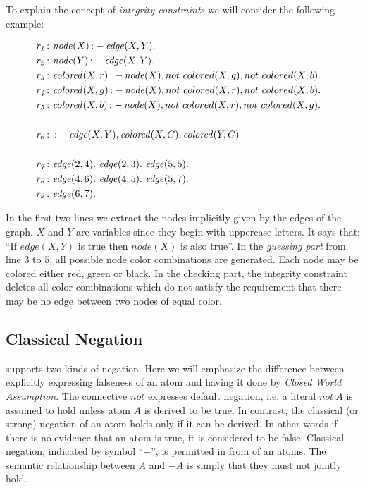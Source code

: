 \documentclass[a4paper, titlepage]{article}
\DeclareMathOperator{\leftimpl}{:-}
\newcommand{\row}[1]{%
  \ensuremath{\it \color{black} #1 \color{black}}%
}
\begin{document}
To explain the concept of \emph{integrity 
constraints} we will consider the following example:
\begin{exmp}
\label{nodecoloring}
\begin{align*}
\row{r_1}\colon & \mathit{node}(X) \leftimpl \mathit{edge}(X, Y). 
&\\
\row{r_2}\colon & \mathit{node}(Y) \leftimpl \mathit{edge}(X, Y). 
& \\
\row{r_3}\colon & \mathit{colored}(X, r) \leftimpl \mathit{node}(X), not \  colored(X,g),not \ colored(X,b). & \\
\row{r_4}\colon & \mathit{colored}(X, g) \leftimpl \mathit{node}(X), not \  colored(X,r),not \ colored(X,b). & \\
\row{r_5}\colon & \mathit{colored}(X, b) \leftimpl \mathit{node}(X), not \  colored(X,r),not \ colored(X,g). & \\
\\
\row{r_6}\colon & \leftimpl \mathit{edge}(X, Y), \mathit{colored}
(X, C), \mathit{colored}(Y, C) & \\
\\
\row{r_7}\colon & \mathit{edge}(2, 4). \  \mathit{edge}(2, 3). \  
\mathit{edge}(5, 5). & \\
\row{r_8}\colon & \mathit{edge}(4, 6). \  \mathit{edge}(4, 5). \ 
\mathit{edge}(5, 7). & \\
\row{r_9}\colon & \mathit{edge}(6, 7). &
\end{align*} 
\end{exmp}
In the first two lines we extract the nodes implicitly given by the edges of the graph.
$X$ and $Y$ are 
variables since they begin with uppercase letters. It says 
that: \enquote{If $\mathit{edge}(X,Y)$ is true then 
$\mathit{node(X)}$ is also true}. In the 
\emph{guessing part} from line $3$ to $5$, all possible node color combinations 
are generated. Each node may be colored either red, 
green or black. In the checking part, the integrity constraint 
deletes all color combinations which do not satisfy the 
requirement that there may be no edge between two nodes of 
equal color.

\subsection{Classical Negation}
\dlvhex{} supports two kinds of negation. Here we will 
emphasize the difference between explicitly expressing 
falseness of an atom and having it done by \emph{Closed 
World Assumption}. The connective $\mathit{not}$ expresses 
default negation, i.e. a literal $\mathit{not} \ A$ is assumed 
to hold unless atom $A$ is derived to be true. In contrast, 
the classical (or strong) negation of an atom holds only if 
it can be derived. In other words if there is no evidence 
that an atom is true, it is considered to be false. 
Classical negation, indicated by symbol ``$-$'', is 
permitted in from of an atoms. The semantic relationship 
between $A$ and $\mathit{-A}$ is simply that they must not jointly 
hold.
\end{document}
